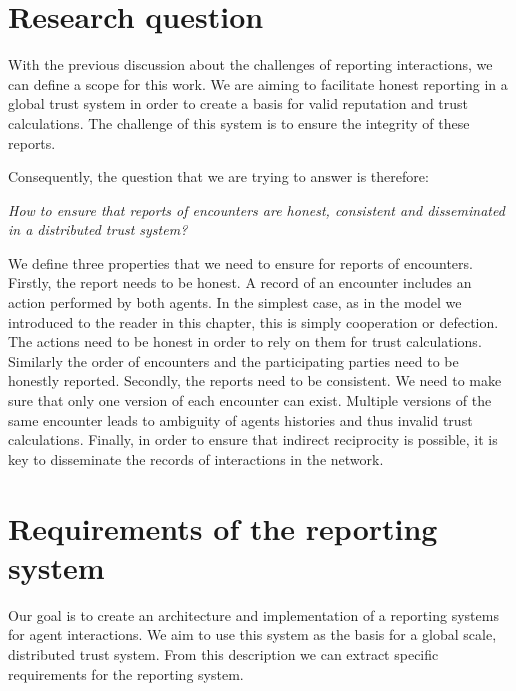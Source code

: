 
\section{Research question}
With the previous discussion about the challenges of reporting interactions, we can define a scope
for this work. We are aiming to facilitate honest reporting in a global trust system in order to 
create a basis for valid reputation and trust calculations. The challenge of this system is to 
ensure the integrity of these reports. 

Consequently, the question that we are trying to answer is therefore:
\begin{center}
    \textit{How to ensure that reports of encounters are honest, consistent and disseminated in a distributed trust system?}
\end{center}

We define three properties that we need to ensure for reports of encounters. Firstly, the report 
needs to be honest. A record of an encounter
includes an action performed by both agents. In the simplest case, as in the model we introduced to
the reader in this chapter, this is simply cooperation or defection. The actions need to be honest 
in order to rely on them for trust calculations. Similarly the order of encounters and the participating
parties need to be honestly reported. Secondly, the reports need to be consistent. We need to make 
sure that only one version of each encounter can exist. Multiple versions of the same encounter
leads to ambiguity of agents histories and thus invalid trust calculations. Finally, in order to 
ensure that indirect reciprocity is possible, it is key to disseminate the records of interactions 
in the network.

\section{Requirements of the reporting system}
Our goal is to create an architecture and implementation of a reporting systems for agent 
interactions. We aim to use this system as the basis for a global scale, distributed trust system. 
From this description we can extract specific requirements for the reporting system.

